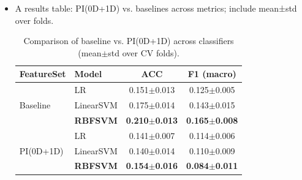 \documentclass[11pt]{article}
\begin{document}
    \begin{itemize}
        \item A results table: PI(0D+1D) vs. baselines across metrics; include mean±std over folds.
            \begin{table}[h!]
                \centering
                \begin{tabular}{llcc}
                \toprule
                \textbf{FeatureSet} & \textbf{Model} & \textbf{ACC} & \textbf{F1 (macro)} \\
                \midrule

                \multirow{3}{*}{Baseline}
                & LR         & 0.151$\pm$0.013 & 0.125$\pm$0.005 \\
                & LinearSVM  & 0.175$\pm$0.014 & 0.143$\pm$0.015 \\
                & \textbf{RBFSVM}     & \textbf{0.210$\pm$0.013} & \textbf{0.165$\pm$0.008} \\

                \midrule

                \multirow{3}{*}{PI(0D+1D)}
                & LR         & 0.141$\pm$0.007 & 0.114$\pm$0.006 \\
                & LinearSVM  & 0.140$\pm$0.014 & 0.110$\pm$0.009 \\
                & \textbf{RBFSVM}     & \textbf{0.154$\pm$0.016} & \textbf{0.084$\pm$0.011} \\

                \bottomrule
                \end{tabular}
                \caption{Comparison of baseline vs. PI(0D+1D) across classifiers (mean$\pm$std over CV folds).}
                \label{tab:results}
            \end{table}


\end{itemize}
\end{document}
